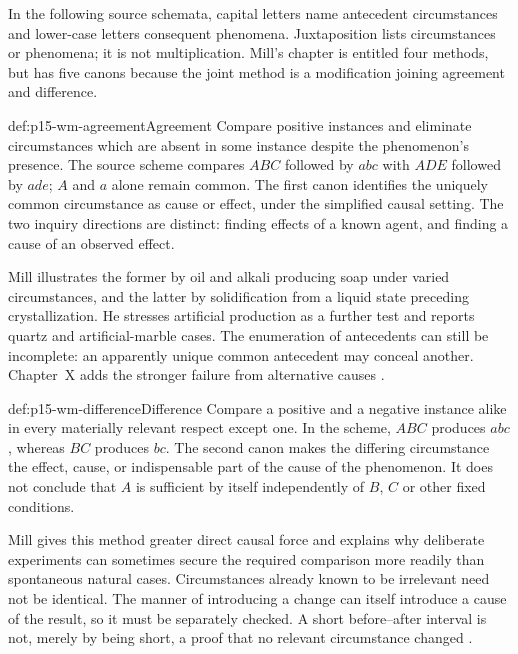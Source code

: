 In the following source schemata, capital letters name antecedent
circumstances and lower-case letters consequent phenomena. Juxtaposition
lists circumstances or phenomena; it is not multiplication.
Mill's chapter is entitled four methods, but has five canons because
the joint method is a modification joining agreement and difference.

\begin{hbmethod}{def:p15-wm-agreement}{Agreement}
Compare positive instances and eliminate circumstances which are absent
in some instance despite the phenomenon's presence.
The source scheme compares \(ABC\) followed by \(abc\) with \(ADE\)
followed by \(ade\); \(A\) and \(a\) alone remain common.
The first canon identifies the uniquely common circumstance as cause
or effect, under the simplified causal setting.
The two inquiry directions are distinct: finding effects of a known
agent, and finding a cause of an observed effect.
\end{hbmethod}

Mill illustrates the former by oil and alkali producing soap under
varied circumstances, and the latter by solidification from a liquid
state preceding crystallization. He stresses artificial production
as a further test and reports quartz and artificial-marble cases.
The enumeration of antecedents can still be incomplete: an apparently
unique common antecedent may conceal another.
Chapter~X adds the stronger failure from alternative causes
\parencite[III.VIII.1 and 3; III.X.1--2]{Mill1882SystemLogicPG}.

\begin{hbmethod}{def:p15-wm-difference}{Difference}
Compare a positive and a negative instance alike in every materially
relevant respect except one. In the scheme, \(ABC\) produces \(abc\),
whereas \(BC\) produces \(bc\).
The second canon makes the differing circumstance the effect, cause,
or indispensable part of the cause of the phenomenon.
It does not conclude that \(A\) is sufficient by itself independently
of \(B\), \(C\) or other fixed conditions.
\end{hbmethod}

Mill gives this method greater direct causal force and explains why
deliberate experiments can sometimes secure the required comparison
more readily than spontaneous natural cases. Circumstances already
known to be irrelevant need not be identical. The manner of introducing
a change can itself introduce a cause of the result, so it must be
separately checked. A short before--after interval is not, merely by
being short, a proof that no relevant circumstance changed
\parencite[III.VIII.2--3]{Mill1882SystemLogicPG}.

